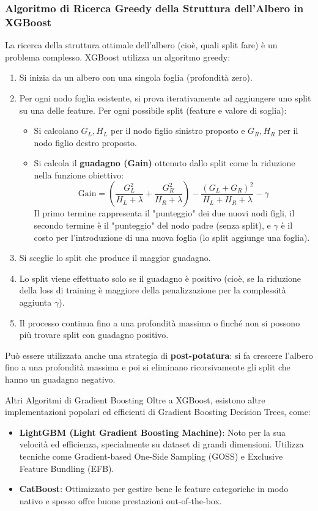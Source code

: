 \documentclass{article}
\begin{document}
\subsubsection{Algoritmo di Ricerca Greedy della Struttura dell'Albero in XGBoost}
La ricerca della struttura ottimale dell'albero (cioè, quali split fare) è un problema complesso. XGBoost utilizza un algoritmo greedy:
\begin{enumerate}
    \item Si inizia da un albero con una singola foglia (profondità zero).
    \item Per ogni nodo foglia esistente, si prova iterativamente ad aggiungere uno split su una delle feature. Per ogni possibile split (feature e valore di soglia):
          \begin{itemize}
              \item Si calcolano $G_L, H_L$ per il nodo figlio sinistro proposto e $G_R, H_R$ per il nodo figlio destro proposto.
              \item Si calcola il \textbf{guadagno (Gain)} ottenuto dallo split come la riduzione nella funzione obiettivo:
                    $$ \text{Gain} = \left( \frac{G_L^2}{H_L+\lambda} + \frac{G_R^2}{H_R+\lambda} \right) - \frac{(G_L+G_R)^2}{H_L+H_R+\lambda} - \gamma $$
                    Il primo termine rappresenta il "punteggio" dei due nuovi nodi figli, il secondo termine è il "punteggio" del nodo padre (senza split), e $\gamma$ è il costo per l'introduzione di una nuova foglia (lo split aggiunge una foglia).
          \end{itemize}
    \item Si sceglie lo split che produce il maggior guadagno.
    \item Lo split viene effettuato solo se il guadagno è positivo (cioè, se la riduzione della loss di training è maggiore della penalizzazione per la complessità aggiunta $\gamma$).
    \item Il processo continua fino a una profondità massima o finché non si possono più trovare split con guadagno positivo.
\end{enumerate}
Può essere utilizzata anche una strategia di \textbf{post-potatura}: si fa crescere l'albero fino a una profondità massima e poi si eliminano ricorsivamente gli split che hanno un guadagno negativo.

\begin{notebox}{Altri Algoritmi di Gradient Boosting}
    Oltre a XGBoost, esistono altre implementazioni popolari ed efficienti di Gradient Boosting Decision Trees, come:
    \begin{itemize}
        \item \textbf{LightGBM (Light Gradient Boosting Machine)}: Noto per la sua velocità ed efficienza, specialmente su dataset di grandi dimensioni. Utilizza tecniche come Gradient-based One-Side Sampling (GOSS) e Exclusive Feature Bundling (EFB).
        \item \textbf{CatBoost}: Ottimizzato per gestire bene le feature categoriche in modo nativo e spesso offre buone prestazioni out-of-the-box.
    \end{itemize}
\end{notebox}
\end{document}
